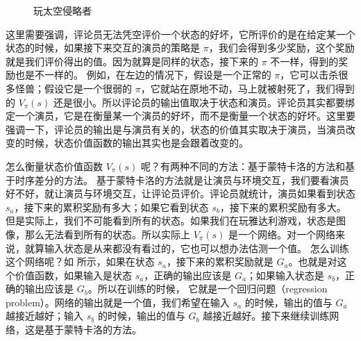 \begin{figure}[hbt]
    \centering
    \caption{玩太空侵略者}
    \label{fig:fig6.1}
\end{figure}

这里需要强调，评论员无法凭空评价一个状态的好坏，它所评价的是在给定某一个状态的时候，如果接下来交互的演员的策略是 $\pi$，我们会得到多少奖励，这个奖励就是我们评价得出的值。因为就算是同样的状态，接下来的 $\pi$ 不一样，得到的奖励也是不一样的。
例如，在左边的情况下，假设是一个正常的 $\pi$，它可以击杀很多怪兽；假设它是一个很弱的 $\pi$，它就站在原地不动，马上就被射死了，我们得到的 $V_\pi(s)$ 还是很小。所以评论员的输出值取决于状态和演员。评论员其实都要绑定一个演员，它是在衡量某一个演员的好坏，而不是衡量一个状态的好坏。这里要强调一下，评论员的输出是与演员有关的，状态的价值其实取决于演员，当演员改变的时候，状态价值函数的输出其实也是会跟着改变的。


怎么衡量状态价值函数 $V_{\pi}(s)$ 呢？有两种不同的方法：基于蒙特卡洛的方法和基于时序差分的方法。
基于蒙特卡洛的方法就是让演员与环境交互，我们要看演员好不好，就让演员与环境交互，让评论员评价。评论员就统计，演员如果看到状态 $s_a$，接下来的累积奖励有多大；如果它看到状态 $s_b$，接下来的累积奖励有多大。
但是实际上，我们不可能看到所有的状态。如果我们在玩雅达利游戏，状态是图像，那么无法看到所有的状态。所以实际上 $V_{\pi}(s)$ 是一个网络。对一个网络来说，就算输入状态是从来都没有看过的，它也可以想办法估测一个值。
怎么训练这个网络呢？如 所示，如果在状态 $s_a$，接下来的累积奖励就是 $G_a$。也就是对这个价值函数，如果输入是状态 $s_a$，正确的输出应该是 $G_a$；如果输入状态是 $s_b$，正确的输出应该是 $G_b$。所以在训练的时候， 它就是一个回归问题（regression problem）。网络的输出就是一个值，我们希望在输入 $s_a$ 的时候，输出的值与 $G_a$ 越接近越好；输入 $s_b$ 的时候，输出的值与 $G_b$ 越接近越好。接下来继续训练网络，这是基于蒙特卡洛的方法。


